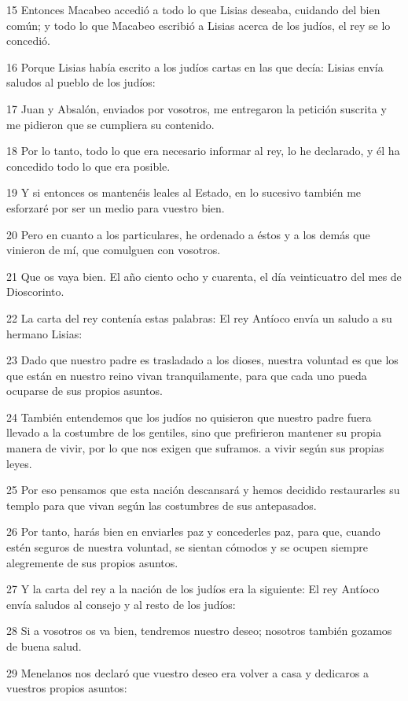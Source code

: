 \par 15 Entonces Macabeo accedió a todo lo que Lisias deseaba, cuidando del bien común; y todo lo que Macabeo escribió a Lisias acerca de los judíos, el rey se lo concedió.
\par 16 Porque Lisias había escrito a los judíos cartas en las que decía: Lisias envía saludos al pueblo de los judíos:
\par 17 Juan y Absalón, enviados por vosotros, me entregaron la petición suscrita y me pidieron que se cumpliera su contenido.
\par 18 Por lo tanto, todo lo que era necesario informar al rey, lo he declarado, y él ha concedido todo lo que era posible.
\par 19 Y si entonces os mantenéis leales al Estado, en lo sucesivo también me esforzaré por ser un medio para vuestro bien.
\par 20 Pero en cuanto a los particulares, he ordenado a éstos y a los demás que vinieron de mí, que comulguen con vosotros.
\par 21 Que os vaya bien. El año ciento ocho y cuarenta, el día veinticuatro del mes de Dioscorinto.
\par 22 La carta del rey contenía estas palabras: El rey Antíoco envía un saludo a su hermano Lisias:
\par 23 Dado que nuestro padre es trasladado a los dioses, nuestra voluntad es que los que están en nuestro reino vivan tranquilamente, para que cada uno pueda ocuparse de sus propios asuntos.
\par 24 También entendemos que los judíos no quisieron que nuestro padre fuera llevado a la costumbre de los gentiles, sino que prefirieron mantener su propia manera de vivir, por lo que nos exigen que suframos. a vivir según sus propias leyes.
\par 25 Por eso pensamos que esta nación descansará y hemos decidido restaurarles su templo para que vivan según las costumbres de sus antepasados.
\par 26 Por tanto, harás bien en enviarles paz y concederles paz, para que, cuando estén seguros de nuestra voluntad, se sientan cómodos y se ocupen siempre alegremente de sus propios asuntos.
\par 27 Y la carta del rey a la nación de los judíos era la siguiente: El rey Antíoco envía saludos al consejo y al resto de los judíos:
\par 28 Si a vosotros os va bien, tendremos nuestro deseo; nosotros también gozamos de buena salud.
\par 29 Menelanos nos declaró que vuestro deseo era volver a casa y dedicaros a vuestros propios asuntos:
